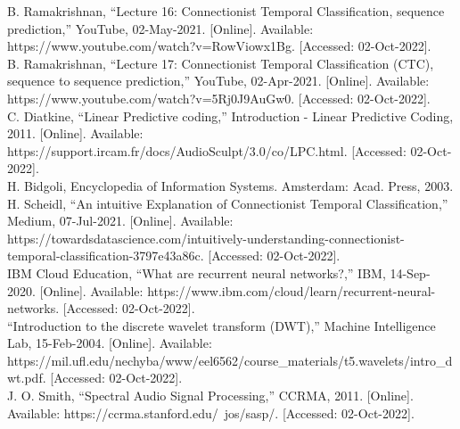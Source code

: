 \newline
B. Ramakrishnan, “Lecture 16: Connectionist Temporal Classification, sequence prediction,” YouTube, 02-May-2021. [Online]. \newline Available: https://www.youtube.com/watch?v=RowViowx1Bg. [Accessed: 02-Oct-2022]. \\
\newline
B. Ramakrishnan, “Lecture 17: Connectionist Temporal Classification (CTC), sequence to sequence prediction,” YouTube, 02-Apr-2021. [Online]. \newline Available: https://www.youtube.com/watch?v=5Rj0J9AuGw0. [Accessed: 02-Oct-2022]. \\
\newline
C. Diatkine, “Linear Predictive coding,” Introduction - Linear Predictive Coding, 2011. [Online]. \newline Available: https://support.ircam.fr/docs/AudioSculpt/3.0/co/LPC.html. [Accessed: 02-Oct-2022]. \\
\newline
H. Bidgoli, Encyclopedia of Information Systems. Amsterdam: Acad. Press, 2003. \\
\newline
H. Scheidl, “An intuitive Explanation of Connectionist Temporal Classification,” Medium, 07-Jul-2021. [Online]. \newline Available: https://towardsdatascience.com/intuitively-understanding-connectionist-temporal-classification-3797e43a86c. [Accessed: 02-Oct-2022]. \\
\newline
IBM Cloud Education, “What are recurrent neural networks?,” IBM, 14-Sep-2020. [Online]. \newline Available: https://www.ibm.com/cloud/learn/recurrent-neural-networks. [Accessed: 02-Oct-2022]. \\
\newline
“Introduction to the discrete wavelet transform (DWT),” Machine Intelligence Lab, 15-Feb-2004. [Online]. \newline Available: https://mil.ufl.edu/nechyba/www/eel6562/course\_materials/t5.wavelets/intro\_dwt.pdf. [Accessed: 02-Oct-2022]. \\
\newline
J. O. Smith, “Spectral Audio Signal Processing,” CCRMA, 2011. [Online]. \newline Available: https://ccrma.stanford.edu/~jos/sasp/. [Accessed: 02-Oct-2022]. \\
\newline

